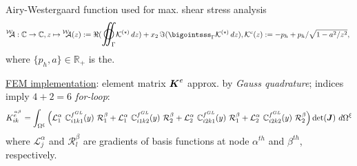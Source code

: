 \documentclass[25pt, a0paper,
portrait,
margin=2mm, 
innermargin=2mm, 
blockverticalspace=7mm, %
colspace=2mm, %
subcolspace=0mm]{tikzposter}
\makeatletter
\newcommand*{\inputfig}[3][htb]{{
    \def\fps@figure{#1}
    \def\DIR{#2}
    \def\LABEL{#3}
    \graphicspath{{\DIR/}}
    
}}
\newcommand{\WA}{\prescript{\mathcal{W}}{}{\!\!\!\mathcal{A}}}
\newcommand{\WAz}{\prescript{\mathcal{W}}{}{\!\!\!\mathcal{A}}(z)}
\newcommand{\mbR}{\mathbb{R}}
\newcommand{\mbC}{\mathbb{C}}
\newcommand{\mcK}{\mathcal{K}}
\newcommand{\bigoiintsss}{\mathlarger{\mathlarger{\varoiint}}}
\newcommand{\Kipc}{\mathcal{K}^{c}}
\newcommand{\Kipcz}{\mathcal{K}^{c}(z)}
\makeatother
\begin{document}
{\begin{minipage}{0.54\textwidth}
\begin{minipage}{0.3\textwidth}
		\end{minipage}
		\begin{mdframed}
			Airy-Westergaard function used for max. shear stress analysis
			\begin{align*}
				\WA:
				\mbC\to\mbC,
				z \mapsto \WAz:=
				\Re(\bigoiintsss_{\Gamma} \mcK^{(\star)}\,dz )
				+ x_2\,
				\Im(\bigointsss_{\Gamma} \mcK^{(\star)}\,dz ),
				\Kipcz:=
				- p_{h} + p_{h}/\sqrt{1 - a^2/z^2},\
			\end{align*}
			where $\{p_{h},a\}\in\mbR_{+}$ is the.
		\end{mdframed}
		\begin{mdframed}
			\underline{FEM implementation}:
			element matrix ${\boldsymbol{\mathnormal K}}^{e}$
			approx. by \textit{Gauss quadrature}; 
			indices imply \textit{$4+2=6$ \textit{for}-loop}:
			\begin{align*}
				K^{\stackrel{\alpha\beta}{e\ \ }}_{ik} = 
				\int_{\Omega^{\xi}}
				\left(
				\mathcal{L}^{\alpha}_{1} \ \mathbb{C}_{i1k1}^{f^{GL}}(y) \ \mathcal{R}^{\beta}_{1} +
				\mathcal{L}^{\alpha}_{1} \ \mathbb{C}_{i1k2}^{f^{GL}}(y) \ \mathcal{R}^{\beta}_{2} +
				\mathcal{L}^{\alpha}_{2} \ \mathbb{C}_{i2k1}^{f^{GL}}(y) \ \mathcal{R}^{\beta}_{1} +
				\mathcal{L}^{\alpha}_{2} \ \mathbb{C}_{i2k2}^{f^{GL}}(y) \ \mathcal{R}^{\beta}_{2}
				\right)
				\det({\boldsymbol{\mathnormal J}}) \ d\Omega^{\xi}
			\end{align*}
			where $\mathcal{L}^{\alpha}_{j}$ and $\mathcal{R}^{\beta}_{l}$ are gradients of basis functions at node $\alpha^{th}$ and $\beta^{th}$, respectively.
		\end{mdframed}
	\end{minipage}
}
\end{document}
